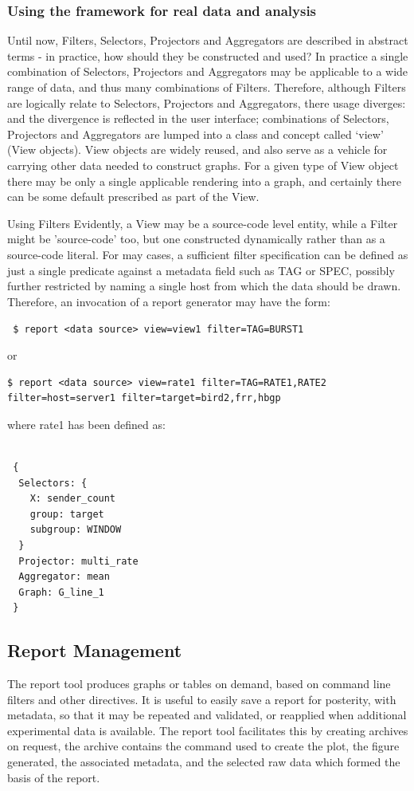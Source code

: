 \subsubsection{ Using the framework for real data and analysis}
 Until now, Filters, Selectors, Projectors and Aggregators are described in abstract terms - in practice, how should they be constructed and used?
 In practice a single combination of Selectors, Projectors and Aggregators may be applicable to a wide range of data, and thus many combinations of Filters.  Therefore, although Filters are logically relate to Selectors, Projectors and Aggregators, there usage diverges: and the divergence is reflected in the user interface; combinations of Selectors, Projectors and Aggregators are lumped into a class and concept called `view' (View objects).  View objects are widely reused, and also serve as a vehicle for carrying other data needed to construct graphs.  For a given type of View object there may be only a single applicable rendering into a graph, and certainly there can be some default prescribed as part of the View.

 Using Filters
 Evidently, a View may be a source-code level entity, while a Filter might be 'source-code' too, but one constructed dynamically rather than as a source-code literal.  For may cases, a sufficient filter specification can be defined as just a single predicate against a metadata field such as TAG or SPEC, possibly further restricted by naming a single host from which the data should be drawn.  Therefore, an invocation of a report generator may have the form:

\verb| $ report <data source> view=view1 filter=TAG=BURST1|

 or 
 
\begin{lstlisting}
$ report <data source> view=rate1 filter=TAG=RATE1,RATE2 filter=host=server1 filter=target=bird2,frr,hbgp
\end{lstlisting}
 where rate1 has been defined as:
\begin{lstlisting}

 {
  Selectors: {
    X: sender_count
    group: target
    subgroup: WINDOW
  }
  Projector: multi_rate
  Aggregator: mean
  Graph: G_line_1
 }
\end{lstlisting}

\subsection{ Report Management}
 The report tool produces graphs or tables on demand, based on command line filters and other directives.
 It is useful to easily save a report for posterity, with metadata, so that it may be repeated and validated, or reapplied when additional experimental data is available.
 The report tool facilitates this by creating archives on request, the archive contains the command used to create the plot, the figure generated, the associated metadata, and the selected raw data which formed the basis of the report.

